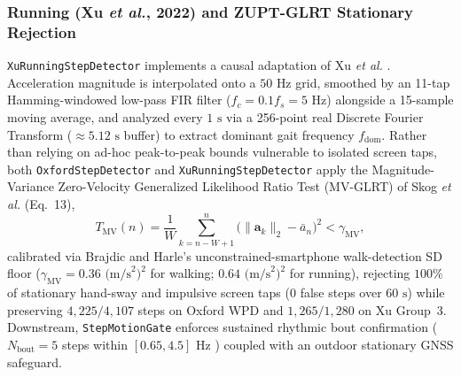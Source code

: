 \documentclass[journal]{IEEEtran}
\begin{document}
\subsubsection{Running (Xu \emph{et al.}, 2022) and ZUPT-GLRT Stationary Rejection}
\texttt{XuRunningStepDetector} implements a causal adaptation of Xu \emph{et al.} \cite{xu2022step}. Acceleration magnitude is interpolated onto a $50\text{ Hz}$ grid, smoothed by an 11-tap Hamming-windowed low-pass FIR filter ($f_c = 0.1 f_s = 5\text{ Hz}$) alongside a 15-sample moving average, and analyzed every $1\text{ s}$ via a 256-point real Discrete Fourier Transform ($\approx 5.12\text{ s}$ buffer) to extract dominant gait frequency $f_{\text{dom}}$. Rather than relying on ad-hoc peak-to-peak bounds vulnerable to isolated screen taps, both \texttt{OxfordStepDetector} and \texttt{XuRunningStepDetector} apply the Magnitude-Variance Zero-Velocity Generalized Likelihood Ratio Test (MV-GLRT) of Skog \emph{et al.} \cite{skog2010zupt} (Eq.~13),
\begin{equation}
  T_{\text{MV}}(n) = \frac{1}{W}\sum_{k=n-W+1}^{n} \bigl(\|\mathbf{a}_k\|_2 - \bar{a}_n\bigr)^2 < \gamma_{\text{MV}},
  \label{eq:skog_zupt}
\end{equation}
calibrated via Brajdic and Harle's unconstrained-smartphone walk-detection SD floor \cite{brajdic2013walk} ($\gamma_{\text{MV}} = 0.36\text{ (m/s}^2)^2$ for walking; $0.64\text{ (m/s}^2)^2$ for running), rejecting $100\%$ of stationary hand-sway and impulsive screen taps ($0$ false steps over $60\text{ s}$) while preserving $4{,}225/4{,}107$ steps on Oxford WPD and $1{,}265/1{,}280$ on Xu Group~3. Downstream, \texttt{StepMotionGate} enforces sustained rhythmic bout confirmation ($N_{\text{bout}} = 5$ steps within $[0.65, 4.5]\text{ Hz}$ \cite{brajdic2013walk}) coupled with an outdoor stationary GNSS safeguard.
\end{document}
